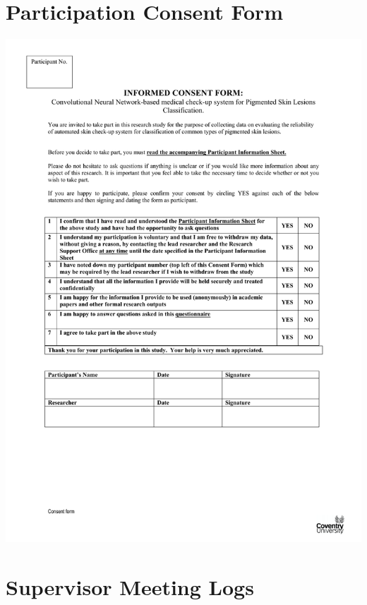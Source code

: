 \section*{Participation Consent Form}
\begin{center}
    \includegraphics[width=15cm]{Documents/consent.pdf}
\end{center}

\section*{Supervisor Meeting Logs}